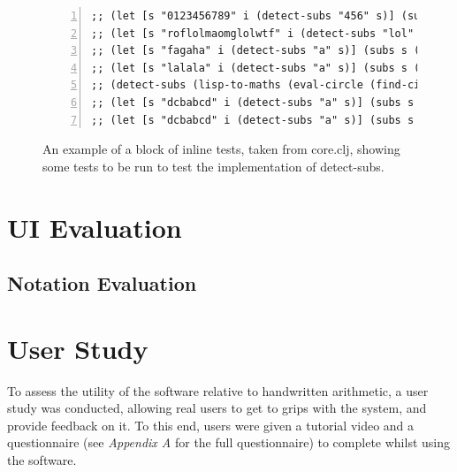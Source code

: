 \documentclass[12pt,twoside,notitlepage,xetex]{report}
\begin{document}
\begin{center}
\begin{figure}[H]
\begin{center}
\begin{minipage}{11.7cm}
\begin{Verbatim}[fontsize=\tiny,numbers=left]
;; (let [s "0123456789" i (detect-subs "456" s)] (subs s (:s (first i)) (:e (first i))))
;; (let [s "roflolmaomglolwtf" i (detect-subs "lol" s)] (subs s (:s (first i)) (:e (first i))))
;; (let [s "fagaha" i (detect-subs "a" s)] (subs s (:s (first i)) (:e (first i))))
;; (let [s "lalala" i (detect-subs "a" s)] (subs s (:s (first i)) (:e (first i))))
;; (detect-subs (lisp-to-maths (eval-circle (find-circle "c0"))) (lisp-to-maths (eval (:q (first @current-qset)))))
;; (let [s "dcbabcd" i (detect-subs "a" s)] (subs s (:s (first i)) (:e (first i))))
;; (let [s "dcbabcd" i (detect-subs "a" s)] (subs s (:s (nth i 1)) (:e (nth i 1))))

\end{Verbatim}
\end{minipage}
\end{center}
\caption{An example of a block of inline tests, taken from {\ttfamily core.clj}, showing some tests to be run to test the implementation of {\ttfamily detect-subs}.}
\end{figure}
\end{center}


\section{UI Evaluation}

\subsection{Notation Evaluation}

\section{User Study}

To assess the utility of the software relative to handwritten arithmetic, a
user study was conducted, allowing real users to get to grips with the system,
and provide feedback on it.  To this end, users were given a tutorial video and
a questionnaire (see \emph{Appendix A} for the full questionnaire) to complete
whilst using the software.
\end{document}
